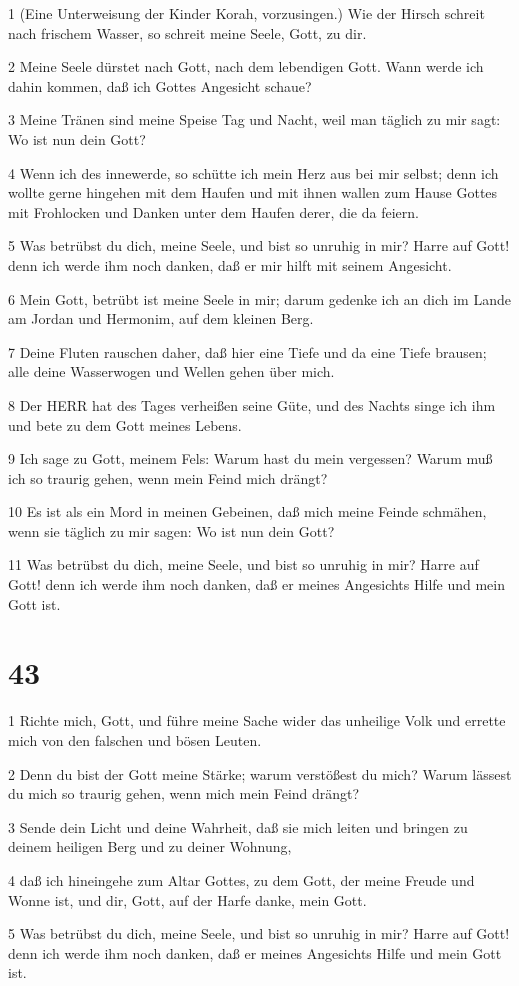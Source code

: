 \par 1 (Eine Unterweisung der Kinder Korah, vorzusingen.) Wie der Hirsch schreit nach frischem Wasser, so schreit meine Seele, Gott, zu dir.
\par 2 Meine Seele dürstet nach Gott, nach dem lebendigen Gott. Wann werde ich dahin kommen, daß ich Gottes Angesicht schaue?
\par 3 Meine Tränen sind meine Speise Tag und Nacht, weil man täglich zu mir sagt: Wo ist nun dein Gott?
\par 4 Wenn ich des innewerde, so schütte ich mein Herz aus bei mir selbst; denn ich wollte gerne hingehen mit dem Haufen und mit ihnen wallen zum Hause Gottes mit Frohlocken und Danken unter dem Haufen derer, die da feiern.
\par 5 Was betrübst du dich, meine Seele, und bist so unruhig in mir? Harre auf Gott! denn ich werde ihm noch danken, daß er mir hilft mit seinem Angesicht.
\par 6 Mein Gott, betrübt ist meine Seele in mir; darum gedenke ich an dich im Lande am Jordan und Hermonim, auf dem kleinen Berg.
\par 7 Deine Fluten rauschen daher, daß hier eine Tiefe und da eine Tiefe brausen; alle deine Wasserwogen und Wellen gehen über mich.
\par 8 Der HERR hat des Tages verheißen seine Güte, und des Nachts singe ich ihm und bete zu dem Gott meines Lebens.
\par 9 Ich sage zu Gott, meinem Fels: Warum hast du mein vergessen? Warum muß ich so traurig gehen, wenn mein Feind mich drängt?
\par 10 Es ist als ein Mord in meinen Gebeinen, daß mich meine Feinde schmähen, wenn sie täglich zu mir sagen: Wo ist nun dein Gott?
\par 11 Was betrübst du dich, meine Seele, und bist so unruhig in mir? Harre auf Gott! denn ich werde ihm noch danken, daß er meines Angesichts Hilfe und mein Gott ist.

\chapter{43}

\par 1 Richte mich, Gott, und führe meine Sache wider das unheilige Volk und errette mich von den falschen und bösen Leuten.
\par 2 Denn du bist der Gott meine Stärke; warum verstößest du mich? Warum lässest du mich so traurig gehen, wenn mich mein Feind drängt?
\par 3 Sende dein Licht und deine Wahrheit, daß sie mich leiten und bringen zu deinem heiligen Berg und zu deiner Wohnung,
\par 4 daß ich hineingehe zum Altar Gottes, zu dem Gott, der meine Freude und Wonne ist, und dir, Gott, auf der Harfe danke, mein Gott.
\par 5 Was betrübst du dich, meine Seele, und bist so unruhig in mir? Harre auf Gott! denn ich werde ihm noch danken, daß er meines Angesichts Hilfe und mein Gott ist.

